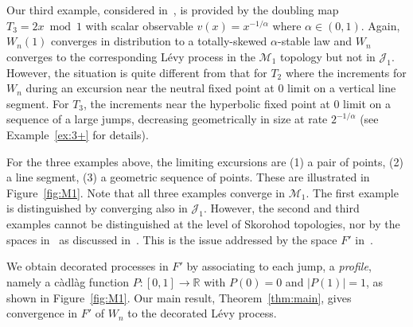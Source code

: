 \documentclass[12pt]{article}
\numberwithin{equation}{section}
\newcommand{\R}{{\mathbb R}}
\newcommand{\cJ}{{\mathcal J}}
\newcommand{\cM}{{\mathcal M}}
\begin{document}
\begin{example} \label{ex:3}
Our third example, considered in~\cite{Gouezel_doub}, is provided by the doubling map $T_3=2x\bmod1$ with scalar observable
$v(x)=x^{-1/\alpha}$ where $\alpha\in(0,1)$. 
Again, $W_n(1)$ converges in distribution to a totally-skewed $\alpha$-stable law and  $W_n$ converges to the corresponding L\'evy process in the $\cM_1$ topology but not in $\cJ_1$.
However, the situation is quite different from that for $T_2$ where the increments for $W_n$ during an excursion near the neutral fixed point at $0$ limit on a vertical line segment. For $T_3$, the increments near the hyperbolic fixed point at $0$ limit on a sequence of a large jumps, decreasing geometrically in size at rate $2^{-1/\alpha}$ 
(see Example~\ref{ex:3+} for details).
\end{example}

For the three examples above,
the limiting excursions are (1) a pair of points, (2) a line segment, (3) a geometric sequence of points. These are illustrated in Figure~\ref{fig:M1}.
Note that all three examples converge in $\cM_1$. The first example is distinguished by converging also in $\cJ_1$. However, the second and third examples cannot be distinguished at the level of Skorohod topologies,  nor by the spaces in~\cite{Whitt} as discussed in~\cite[Section 2.3]{Freitas2Toddsub}. This is the issue addressed by the space $F'$ in~\cite{Freitas2Toddsub}. 

We obtain decorated processes in $F'$ by associating
to each jump, a \emph{profile}, namely a c\`adl\`ag function $P:[0,1]\to\R$ with $P(0)=0$ and $|P(1)|=1$, as shown in Figure~\ref{fig:M1}. 
Our main result, Theorem~\ref{thm:main}, gives convergence in $F'$ of $W_n$ to the decorated L\'evy process.
\end{document}
